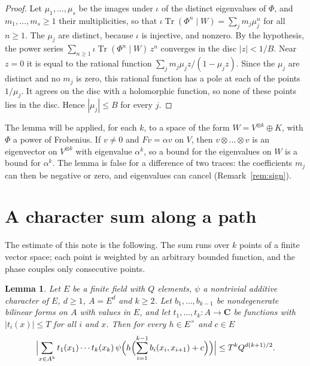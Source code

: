 \documentclass[11pt,a4paper]{article}
\theoremstyle{plain}
\newtheorem{lemma}[theorem]{Lemma}
\theoremstyle{remark}
\newcommand{\Tr}{\operatorname{Tr}}
\begin{document}
\begin{proof}
Let $\mu_1,\dots,\mu_s$ be the images under $\iota$ of the distinct eigenvalues of $\Phi$, and $m_1,\dots,m_s\ge1$
their multiplicities, so that $\iota\Tr(\Phi^n\mid W)=\sum_jm_j\mu_j^n$ for all $n\ge1$. The $\mu_j$ are distinct,
because $\iota$ is injective, and nonzero. By the hypothesis, the power series
$\sum_{n\ge1}\iota\Tr(\Phi^n\mid W)\,z^n$ converges in the disc $|z|<1/B$. Near $z=0$ it is equal to the rational
function $\sum_jm_j\mu_jz/(1-\mu_jz)$. Since the $\mu_j$ are distinct and no $m_j$ is zero, this rational function
has a pole at each of the points $1/\mu_j$. It agrees on the disc with a holomorphic function, so none of these
points lies in the disc. Hence $|\mu_j|\le B$ for every $j$.
\end{proof}

The lemma will be applied, for each $k$, to a space of the form $W=V^{\otimes k}\oplus K$, with $\Phi$ a power of
Frobenius. If $v\ne0$ and $Fv=\alpha v$ on $V$, then $v\otimes\dots\otimes v$ is an eigenvector on $V^{\otimes k}$
with eigenvalue $\alpha^k$, so a bound for the eigenvalues on $W$ is a bound for $\alpha^k$. The lemma is false for
a difference of two traces: the coefficients $m_j$ can then be negative or zero, and eigenvalues can cancel
(Remark~\ref{rem:sign}).

\section{A character sum along a path}\label{sec:parseval}

The estimate of this note is the following. The sum runs over $k$ points of a finite vector space; each point is
weighted by an arbitrary bounded function, and the phase couples only consecutive points.

\begin{lemma}\label{lem:parseval}
Let $E$ be a finite field with $Q$ elements, $\psi$ a nontrivial additive character of $E$, $d\ge1$, $A=E^d$ and
$k\ge2$. Let $b_1,\dots,b_{k-1}$ be nondegenerate bilinear forms on $A$ with values in $E$, and let
$t_1,\dots,t_k:A\to\mathbf C$ be functions with $|t_i(x)|\le T$ for all $i$ and $x$. Then for every $h\in E^\times$
and $c\in E$
\[
\Bigl|\sum_{x\in A^k}t_1(x_1)\cdots t_k(x_k)\,\psi\Bigl(h\Bigl(\sum_{i=1}^{k-1}b_i(x_i,x_{i+1})+c\Bigr)\Bigr)\Bigr|
\le T^kQ^{d(k+1)/2}.
\]
\end{lemma}
\end{document}
